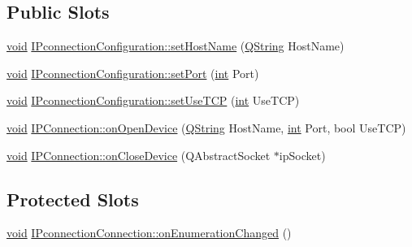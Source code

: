 \subsection*{Public Slots}
\begin{DoxyCompactItemize}
\item 
\hyperlink{group___u_a_v_objects_plugin_ga444cf2ff3f0ecbe028adce838d373f5c}{void} \hyperlink{group___i_p_conn_plugin_ga88855a0ecb5df4caaf47450815ff761a}{I\-Pconnection\-Configuration\-::set\-Host\-Name} (\hyperlink{group___u_a_v_objects_plugin_gab9d252f49c333c94a72f97ce3105a32d}{Q\-String} Host\-Name)
\item 
\hyperlink{group___u_a_v_objects_plugin_ga444cf2ff3f0ecbe028adce838d373f5c}{void} \hyperlink{group___i_p_conn_plugin_gacce8d065ea6dd85639e0e1aea893ce9c}{I\-Pconnection\-Configuration\-::set\-Port} (\hyperlink{ioapi_8h_a787fa3cf048117ba7123753c1e74fcd6}{int} Port)
\item 
\hyperlink{group___u_a_v_objects_plugin_ga444cf2ff3f0ecbe028adce838d373f5c}{void} \hyperlink{group___i_p_conn_plugin_ga58320607e7ef94199aa35fd7b7b4df21}{I\-Pconnection\-Configuration\-::set\-Use\-T\-C\-P} (\hyperlink{ioapi_8h_a787fa3cf048117ba7123753c1e74fcd6}{int} Use\-T\-C\-P)
\item 
\hyperlink{group___u_a_v_objects_plugin_ga444cf2ff3f0ecbe028adce838d373f5c}{void} \hyperlink{group___i_p_conn_plugin_ga2620fdde71bd8399a44eeec513197962}{I\-P\-Connection\-::on\-Open\-Device} (\hyperlink{group___u_a_v_objects_plugin_gab9d252f49c333c94a72f97ce3105a32d}{Q\-String} Host\-Name, \hyperlink{ioapi_8h_a787fa3cf048117ba7123753c1e74fcd6}{int} Port, bool Use\-T\-C\-P)
\item 
\hyperlink{group___u_a_v_objects_plugin_ga444cf2ff3f0ecbe028adce838d373f5c}{void} \hyperlink{group___i_p_conn_plugin_gac260d56bd7a0226cc1c047062b705314}{I\-P\-Connection\-::on\-Close\-Device} (Q\-Abstract\-Socket $\ast$ip\-Socket)
\end{DoxyCompactItemize}
\subsection*{Protected Slots}
\begin{DoxyCompactItemize}
\item 
\hyperlink{group___u_a_v_objects_plugin_ga444cf2ff3f0ecbe028adce838d373f5c}{void} \hyperlink{group___i_p_conn_plugin_ga1163b3efc22084c70e47aa84ac84c612}{I\-Pconnection\-Connection\-::on\-Enumeration\-Changed} ()
\end{DoxyCompactItemize}

